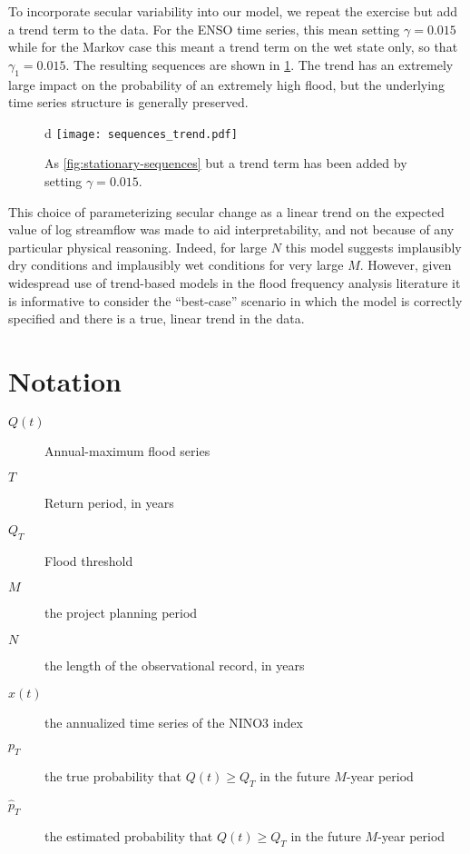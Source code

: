 \documentclass[12pt]{article}
\begin{document}
To incorporate secular variability into our model, we repeat the exercise but add a trend term to the data.
For the ENSO time series, this mean setting \(\gamma=0.015\) while for the Markov case this meant a trend term on the wet state only, so that \(\gamma_1=0.015\).
The resulting sequences are shown in \cref{fig:trend-sequences}.
The trend has an extremely large impact on the probability of an extremely high flood, but the underlying time series structure is generally preserved.
\begin{figure}[b]d
  \texttt{[image: sequences\_trend.pdf]}
  \caption{
    As \cref{fig:stationary-sequences} but a trend term has been added by setting \(\gamma=0.015\).\label{fig:trend-sequences}
  }
\end{figure}

This choice of parameterizing secular change as a linear trend on the expected value of log streamflow was made to aid interpretability, and not because of any particular physical reasoning.
Indeed, for large $N$ this model suggests implausibly dry conditions and implausibly wet conditions for very large $M$.
However, given widespread use of trend-based models in the flood frequency analysis literature it is informative to consider the ``best-case'' scenario in which the model is correctly specified and there is a true, linear trend in the data.

\section{Notation}

\begin{description}
  \item[\( Q(t) \)] Annual-maximum flood series
  \item[\( T \)] Return period, in years
  \item[\( Q_T \)] Flood threshold
  \item[\( M \)] the project planning period
  \item[\( N \)] the length of the observational record, in years
  \item[\( x(t) \)] the annualized time series of the NINO3 index
  \item[\( p_T \)] the true probability that \( Q(t) \geq Q_T \) in the future $M$-year period
  \item[\( \hat{p}_T \)] the estimated probability that \( Q(t) \geq Q_T \) in the future $M$-year period
\end{description}

\printbibliography{}
\end{document}
